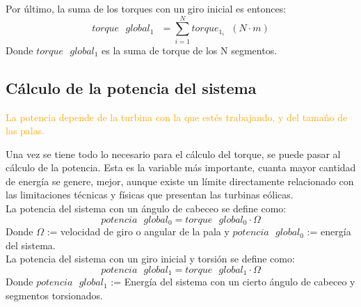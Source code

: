 Por último, la suma de los torques con un giro inicial es entonces:
\begin{equation}
  torque \text{ } global_1 \text{ } = \sum_{i=1}^{N} torque_{1_i} \hspace{7pt} (N \cdot m)
 \label{def:torque_global_1}
\end{equation}
Donde $torque \text{ } global_1$ es la suma de torque de los N segmentos.





















\subsection{Cálculo de la potencia del sistema}
\label{section:pot_sistema}
 
 \textcolor{orange}{\huge La potencia depende de la turbina con la que estés trabajando, y del tamaño de las palas.}
 
 Una vez se tiene todo lo necesario para el cálculo del torque, se puede pasar al cálculo de la potencia. Esta es la variable más importante, cuanta mayor cantidad de energía se genere, mejor, aunque existe un límite directamente relacionado con las limitaciones técnicas y físicas que presentan las turbinas eólicas. \\
 
 
  La potencia del sistema con un ángulo de cabeceo se define como:
  \begin{equation}
  potencia \text{ } global_0 = torque \text{ } global_0 \cdot \Omega  
 \label{def:potencia_giro_inicial}
 \end{equation}
  Donde $\Omega$ := velocidad de giro o angular de la pala y $potencia \text{ } global_0$ := energía del sistema.\\
 
  La potencia del sistema con un giro inicial y torsión se define como:
   \begin{equation}
  potencia \text{ } global_1 = torque \text{ } global_1 \cdot \Omega  
 \label{def:potencia_giro_segmentos}
 \end{equation}
  Donde $potencia \text{ } global_1$ := Energía del sistema con un cierto ángulo de cabeceo y segmentos torsionados.\\
 
